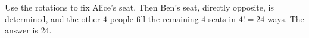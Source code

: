 Use the rotations to fix Alice's seat. Then Ben's seat, directly opposite, is determined, and the other $4$ people fill the remaining $4$ seats in $4!=24$ ways. The answer is $\boxed{24}$.
